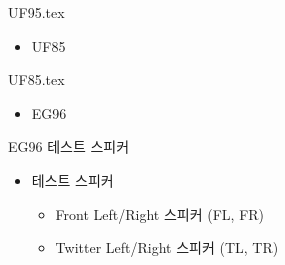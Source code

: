 \documentclass{beamer}
\begin{document}
{UF95.tex}



\begin{frame}[t]{}
\tableofcontents
\huge
\begin{itemize}
\huge \item UF85
\end{itemize}
\end{frame}

{UF85.tex}






\begin{frame}[t]{}
\tableofcontents
\huge
\begin{itemize}
\huge \item EG96
\end{itemize}
\end{frame}




\begin{frame}[t]{EG96 테스트 스피커}
\begin{itemize}
\huge \item 테스트 스피커
	\begin{itemize}
	\large \item Front Left/Right 스피커 (FL, FR)
	\large \item Twitter Left/Right 스피커 (TL, TR)
	\end{itemize}
\end{itemize}
\end{frame}



\end{document}

